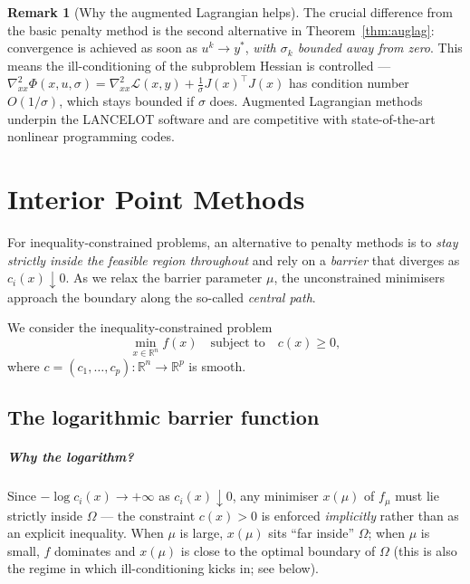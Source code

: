 \documentclass[11pt,a4paper]{report}
\theoremstyle{plain}
\theoremstyle{definition}
\newtheorem{remark}[theorem]{Remark}
\newcommand{\R}{\mathbb{R}}
\newcommand{\hess}{\nabla^{2}}
\newcommand{\trans}{^{\top}}
\begin{document}
\begin{remark}[Why the augmented Lagrangian helps]
The crucial difference from the basic penalty method is the second alternative
in Theorem~\ref{thm:auglag}: convergence is achieved as soon as $u^{k}\to y^{*}$,
\emph{with $\sigma_{k}$ bounded away from zero}. This means the ill-conditioning
of the subproblem Hessian is controlled — $\hess_{xx}\Phi(x,u,\sigma)=
\hess_{xx}\mathcal{L}(x,y)+\frac{1}{\sigma}J(x)\trans J(x)$ has condition number
$O(1/\sigma)$, which stays bounded if $\sigma$ does. Augmented Lagrangian methods
underpin the LANCELOT software and are competitive with state-of-the-art
nonlinear programming codes.
\end{remark}


\chapter{Interior Point Methods}

For inequality-constrained problems, an alternative to penalty methods is to
\emph{stay strictly inside the feasible region throughout} and rely on a
\emph{barrier} that diverges as $c_{i}(x)\downarrow 0$. As we relax the barrier
parameter $\mu$, the unconstrained minimisers approach the boundary
along the so-called \emph{central path}.

We consider the inequality-constrained problem
\begin{equation}\label{eq:iCP}\tag{iCP}
\min_{x\in\R^{n}} f(x)\quad\text{subject to}\quad c(x)\ge 0,
\end{equation}
where $c=(c_{1},\dots,c_{p}):\R^{n}\to\R^{p}$ is smooth.

\section{The logarithmic barrier function}

\paragraph{Why the logarithm?} Since $-\log c_{i}(x)\to+\infty$ as $c_{i}(x)\downarrow 0$,
any minimiser $x(\mu)$ of $f_{\mu}$ must lie strictly inside $\Omega$ — the
constraint $c(x)>0$ is enforced \emph{implicitly} rather than as an explicit
inequality. When $\mu$ is large, $x(\mu)$ sits ``far inside'' $\Omega$; when $\mu$
is small, $f$ dominates and $x(\mu)$ is close to the optimal boundary of $\Omega$
(this is also the regime in which ill-conditioning kicks in; see below).
\end{document}
